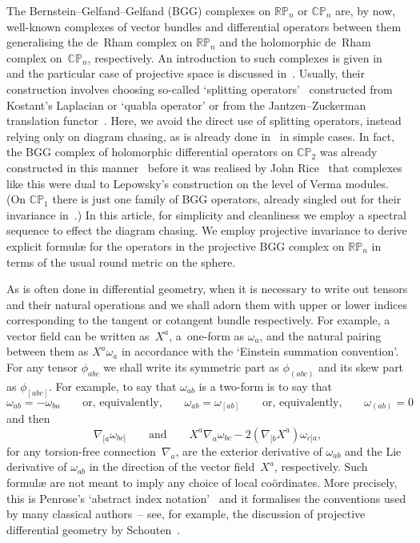 The Bernstein--Gelfand--Gelfand (BGG) complexes on ${\mathbb{RP}}_n$ or
${\mathbb{CP}}_n$ are, by now, well-known complexes of vector bundles and
dif\/ferential operators between them generalising the de~Rham complex on
${\mathbb{RP}}_n$ and the holomorphic de~Rham complex on~${\mathbb{CP}}_n$,
respectively. An introduction to such complexes is given in~\cite{eVariations}
and the particular case of projective space is discussed in~\cite{eProjective}.
Usually, their construction involves choosing so-called `splitting
operators'~\cite{cd,css4} constructed from Kostant's Laplacian \cite{k} or
`quabla operator' \cite{cd} or from the Jantzen--Zuckerman translation
functor~\cite{v}. Here, we avoid the direct use of splitting operators, instead
relying only on diagram chasing, as is already done
in~\cite{eVariations,eProjective} in simple cases. In fact, the BGG complex of
holomorphic dif\/ferential operators on ${\mathbb{CP}}_2$ was already constructed
in this manner~\cite[p.~351]{eDuality} before it was realised by John
Rice~\cite{r} that complexes like this were dual to Lepowsky's construction
\cite{l} on the level of Verma modules. (On ${\mathbb{CP}}_1$ there is just one
family of BGG operators, already singled out for their invariance
in~\cite[Proposition~2.1]{et}.) In this article, for simplicity and cleanliness
we employ a spectral sequence to ef\/fect the diagram chasing. We employ
projective invariance to derive explicit formul{\ae} for the operators in the
projective BGG complex on ${\mathbb{RP}}_n$ in terms of the usual round metric
on the sphere.

As is often done in dif\/ferential geometry, when it is necessary to write out
tensors and their natural operations and we shall adorn them with upper or
lower indices corresponding to the tangent or cotangent bundle respectively.
For example, a vector f\/ield can be written as~$X^a$, a~one-form as $\omega_a$,
and the natural pairing between them as $X^a\omega_a$ in accordance with the
`Einstein summation convention'. For any tensor $\phi_{abc}$ we shall write its
symmetric part as $\phi_{(abc)}$ and its skew part as $\phi_{[abc]}$. For
example, to say that $\omega_{ab}$ is a two-form is to say that
\[\omega_{ab}=-\omega_{ba}\qquad
\mbox{or, equivalently,}\qquad\omega_{ab}=\omega_{[ab]}\qquad
\mbox{or, equivalently,}\qquad\omega_{(ab)}=0\]
and then
\[\nabla_{[a}\omega_{bc]}\qquad\mbox{and}\qquad
X^a\nabla_a\omega_{bc}-2(\nabla_{[b}X^a)\omega_{c]a},\]
for any torsion-free connection~$\nabla_a$, are the exterior derivative of
$\omega_{ab}$ and the Lie derivative of $\omega_{ab}$ in the direction of the
vector f\/ield~$X^a$, respectively. Such formul{\ae} are not meant to imply any
choice of local co\"ordinates. More precisely, this is Penrose's `abstract
index notation'~\cite{OT} and it formalises the conventions used by many
classical authors~-- see, for example, the discussion of projective dif\/ferential
geometry by Schouten~\cite{s}.

